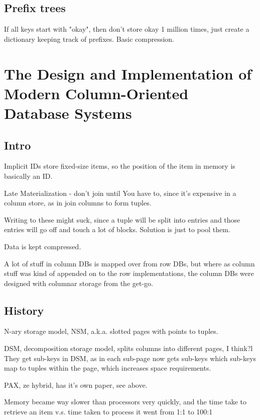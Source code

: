 \documentclass{article}
\begin{document}
	\subsection{Prefix trees}
	
		If all keys start with "okay", then don't store okay 1 million  times, just create a dictionary keeping track of prefixes. Basic compression.
		
\newpage
\section{The Design and Implementation of Modern Column-Oriented Database Systems}

	\subsection{Intro}
	
		Implicit IDs store fixed-size items, so the position of the item in memory is basically an ID.
		
		Late Materialization - don't join until You have to, since it's expensive in a column store, as in join columns to form tuples.
		
		Writing to these might suck, since a tuple will be split into entries and those entries will go off and touch a lot of blocks. Solution is just to pool them.
		
		Data is kept compressed.
		
		A lot of stuff in column DBs is mapped over from row DBs, but where as column stuff was kind of appended on to the row implementations, the column DBs were designed with columnar storage from the get-go.
		
	\subsection{History}
	
		N-ary storage model, NSM, a.k.a. slotted pages with points to tuples.
		
		DSM, decomposition storage model, splits columns into different pages, I think?l They get sub-keys in DSM, as in each sub-page now gets sub-keys which sub-keys map to tuples within the page, which increases space requirements.
		
		PAX, ze hybrid, has it's own paper, see above.
		
		Memory became way slower than processors very quickly, and the time take to retrieve an item v.s. time taken to process it went from 1:1 to 100:1
		
\end{document}
